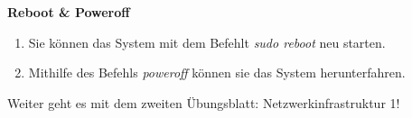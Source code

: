 \documentclass[paper=a4,fontsize=11pt]{scrartcl}%
\numberwithin{equation}{section}
\begin{document}
\begin{center}\Large{\textbf{Reboot \& Poweroff}}\end{center}\vskip0.25in
\begin{enumerate}
	\item Sie können das System mit dem Befehlt \emph{sudo reboot} neu starten.
	\item Mithilfe des Befehls \emph{poweroff} können sie das System herunterfahren.
\end{enumerate}

Weiter geht es mit dem zweiten Übungsblatt: Netzwerkinfrastruktur 1!
\end{document}
